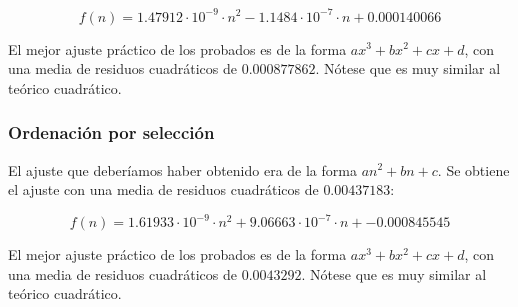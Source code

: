 \documentclass[a4paper, 11pt]{article} %
\begin{document}
   $$f(n)=1.47912\cdot 10^{-9}\cdot n^2-1.1484\cdot 10^{-7}\cdot n+0.000140066$$
  
  El mejor ajuste práctico de los probados es de la forma $ax^3+bx^2+cx+d$,
  con una media de residuos cuadráticos de $0.000877862$. Nótese que es muy similar
  al teórico cuadrático.
  
    \noindent{}
    
  \subsubsection{Ordenación por selección}
  El ajuste que deberíamos haber obtenido era de la forma $a n^2+bn+c$.
  Se obtiene el ajuste con una media de residuos cuadráticos de $0.00437183$:

   $$f(n)= 1.61933\cdot 10^{-9}\cdot n^2+9.06663\cdot 10^{-7}\cdot n+-0.000845545$$
  
  El mejor ajuste práctico de los probados es de la forma $ax^3+bx^2+cx+d$,
  con una media de residuos cuadráticos de $0.0043292$. Nótese que es muy similar
  al teórico cuadrático.
    
    \noindent{}
    
\end{document}
